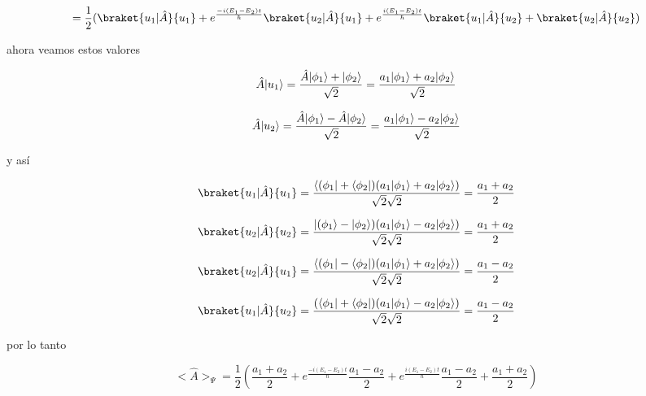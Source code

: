 \documentclass[12pt,a4paper]{article}
\DeclarePairedDelimiter\bra{\langle}{\rvert}
\DeclarePairedDelimiter\ket{\lvert}{\rangle}
\begin{document}
\begin{enumerate}
\begin{enumerate}
    \begin{equation*}
        = \frac{1}{2} (\braket{u_1|\hat{A}}{u_1} + e^{\frac{-i(E_1 - E_2)t}{\hbar}}\braket{u_2|\hat{A}}{u_1} + e^{\frac{i (E_1 -E_2)t}{\hbar}} \braket{u_1 |\hat{A}}{u_2} + \braket{u_2|\hat{A}}{u_2})
    \end{equation*}
    
    ahora veamos estos valores
    
    \begin{equation*}
        \hat{A} \ket{u_1} = \frac{\hat{A}\ket{\phi_1} + \ket{\phi_2}}{\sqrt{2}} = \frac{a_1 \ket{\phi_1} + a_2 \ket{\phi_2}}{\sqrt{2}}
    \end{equation*}
    
    \begin{equation*}
        \hat{A} \ket{u_2} = \frac{\hat{A} \ket{\phi_1} - \hat{A} \ket{\phi_2}}{\sqrt{2}} = \frac{a_1 \ket{\phi_1} - a_2 \ket{\phi_2}}{\sqrt{2}}
    \end{equation*}
    
    y así
    
    \begin{equation*}
        \braket{u_1| \hat{A}}{u_1} = \frac{\bra{(\phi_1} + \bra{\phi_2})(a_1 \ket{\phi_1} + a_2 \ket{\phi_2})}{\sqrt{2}\sqrt{2}} = \frac{a_1 + a_2}{2}
    \end{equation*}
    
    \begin{equation*}
        \braket{u_2|\hat{A}}{u_2} = \frac{\ket{(\phi_1} - \ket{\phi_2})(a_1\ket{\phi_1}- a_2 \ket{\phi_2})}{\sqrt{2}\sqrt{2}} = \frac{a_1 + a_2}{2}
    \end{equation*}
    
    
    \begin{equation*}
        \braket{u_2|\hat{A}}{u_1} = \frac{\bra{(\phi_1} - \bra{\phi_2})(a_1 \ket{\phi_1} + a_2 \ket{\phi_2})}{\sqrt{2}\sqrt{2}} = \frac{a_1 - a_2}{2}
    \end{equation*}
    
    \begin{equation*}
        \braket{u_1 | \hat{A}}{u_2} = \frac{(\bra{\phi_1} + \bra{\phi_2})(a_1\ket{\phi_1} - a_2 \ket{\phi_2})}{\sqrt{2}\sqrt{2}} = \frac{a_1 - a_2}{2} 
    \end{equation*}
    
    por lo tanto
    
    
    
    
    
    \begin{equation*}
      <\hat{A}>_{\Psi}  = \frac{1}{2}(\frac{a_1+a_2}{2} + e^{\frac{-i(E_1-E_2)t}{\hbar}}\frac{a_1 - a_2}{2} + e^{\frac{i(E_1 - E_2)t}{\hbar}}\frac{a_1 - a_2}{2} + \frac{a_1 + a_2}{2})
    \end{equation*}
    

\end{enumerate}
\end{enumerate}
\end{document}
